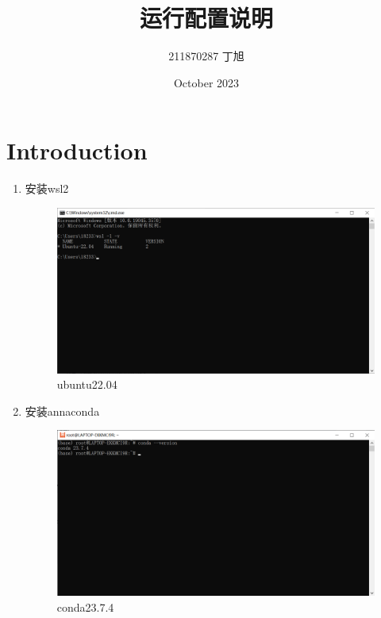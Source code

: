 \documentclass{article}
\title{运行配置说明}
\author{211870287 丁旭 }
\date{October 2023}
\begin{document}
\maketitle

\section{Introduction}
\begin{enumerate}
    \item 安装wsl2
\begin{figure}[htp]
        \centering
        \includegraphics[width=16cm]{wsl-version.png}
        \caption{ubuntu22.04}
        \label{pic7}
\end{figure}

\newpage

    \item 安装annaconda
\begin{figure}[htp]
        \centering
        \includegraphics[width=16cm]{conda版本.png}
        \caption{conda23.7.4}
        \label{pic7}
\end{figure}


\end{enumerate}
\end{document}
